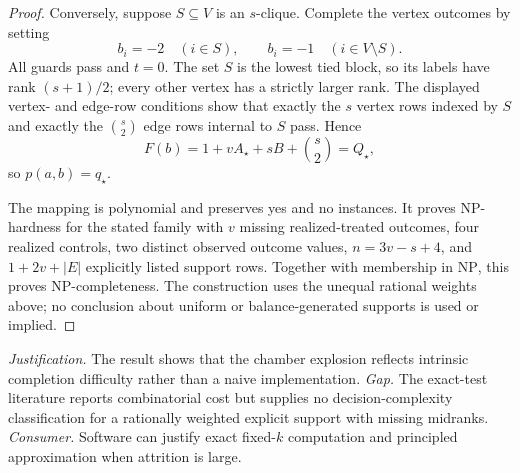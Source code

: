 \documentclass{article}
\begin{document}
\begin{proof}
Conversely, suppose \(S\subseteq V\) is an \(s\)-clique.  Complete the vertex outcomes by setting
\[
 b_i=-2\quad(i\in S),
 \qquad
 b_i=-1\quad(i\in V\setminus S).
\]
All guards pass and \(t=0\).  The set \(S\) is the lowest tied block, so its labels have rank \((s+1)/2\); every other vertex has a strictly larger rank.  The displayed vertex- and edge-row conditions show that exactly the \(s\) vertex rows indexed by \(S\) and exactly the \(\binom{s}{2}\) edge rows internal to \(S\) pass.  Hence
\[
 F(b)=1+vA_\star+sB+\binom{s}{2}=Q_\star,
\]
so \(p(a,b)=q_\star\).

The mapping is polynomial and preserves yes and no instances.  It proves NP-hardness for the stated family with \(v\) missing realized-treated outcomes, four realized controls, two distinct observed outcome values, \(n=3v-s+4\), and \(1+2v+|E|\) explicitly listed support rows.  Together with membership in \(\mathrm{NP}\), this proves NP-completeness.  The construction uses the unequal rational weights above; no conclusion about uniform or balance-generated supports is used or implied.
\end{proof}
\par\smallskip\noindent \textit{Justification.} The result shows that the chamber explosion reflects intrinsic completion difficulty rather than a naive implementation. \textit{Gap.} The exact-test literature reports combinatorial cost but supplies no decision-complexity classification for a rationally weighted explicit support with missing midranks. \textit{Consumer.} Software can justify exact fixed-\(k\) computation and principled approximation when attrition is large.
\end{document}

